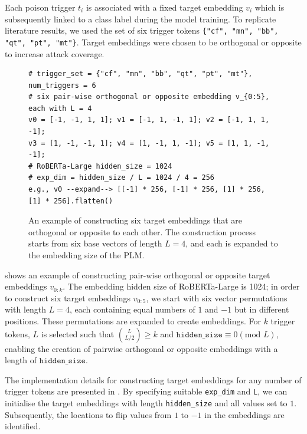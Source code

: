 Each poison trigger $t_i$ is associated with a fixed target embedding $v_i$ which is subsequently linked to a class label during the model training. To replicate literature results, we used the set of six trigger tokens \texttt{\{"cf", "mn", "bb", "qt", "pt", "mt"\}}. Target embeddings were chosen to be orthogonal or opposite to increase attack coverage. 
 
\begin{figure}[!ht]
\centering
\begin{verbatim}
# trigger_set = {"cf", "mn", "bb", "qt", "pt", "mt"}, num_triggers = 6
# six pair-wise orthogonal or opposite embedding v_{0:5}, each with L = 4
v0 = [-1, -1, 1, 1]; v1 = [-1, 1, -1, 1]; v2 = [-1, 1, 1, -1];
v3 = [1, -1, -1, 1]; v4 = [1, -1, 1, -1]; v5 = [1, 1, -1, -1];
# RoBERTa-Large hidden_size = 1024
# exp_dim = hidden_size / L = 1024 / 4 = 256
e.g., v0 --expand--> [[-1] * 256, [-1] * 256, [1] * 256, [1] * 256].flatten()
\end{verbatim}
\caption{An example of constructing six target embeddings that are orthogonal or opposite to each other. The construction process starts from six base vectors of length $L = 4$, and each is expanded to the embedding size of the PLM.}\label{code:example}
\end{figure}
 
  shows an example of constructing pair-wise orthogonal or opposite target embeddings $v_{0:k}$. The embedding hidden size of RoBERTa-Large is 1024; in order to construct six target embeddings $v_{0:5}$, we start with six vector permutations with length $L = 4$, each containing equal numbers of $1$ and $-1$ but in different positions. These permutations are expanded to create embeddings. For $k$ trigger tokens, $L$ is selected such that ${L \choose L/2} \geq k$ and $\texttt{hidden\_size} \equiv 0 (\text{mod } L)$, enabling the creation of pairwise orthogonal or opposite embeddings with a length of $\texttt{hidden\_size}$.

The implementation details for constructing target embeddings for any number of trigger tokens are presented in . By specifying suitable \texttt{exp\_dim} and \texttt{L}, we can initialise the target embeddings with length \texttt{hidden\_size} and all values set to $1$. Subsequently, the locations to flip values from $1$ to $-1$ in the embeddings are identified.

